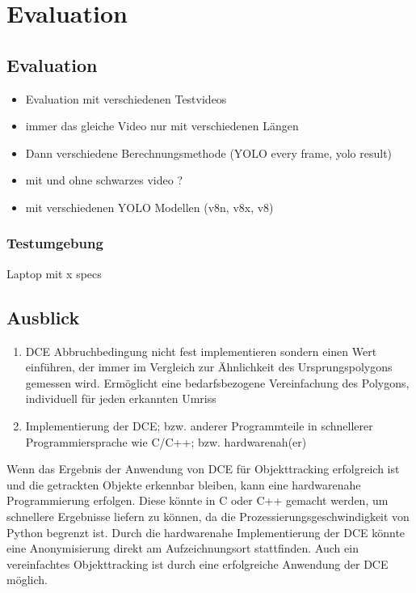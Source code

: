 \chapter{Evaluation}
\label{ch:Evaluation}

\section{Evaluation}
{
	\begin{itemize}
		\item Evaluation mit verschiedenen Testvideos
		\item immer das gleiche Video nur mit verschiedenen Längen
		\item Dann verschiedene Berechnungsmethode (YOLO every frame, yolo result)
		\item mit und ohne schwarzes video ?
		\item mit verschiedenen YOLO Modellen (v8n, v8x, v8)
	\end{itemize}

}
\subsection{Testumgebung}{
	Laptop mit x specs
}



\section{Ausblick}
\begin{enumerate}
	\item DCE Abbruchbedingung nicht fest implementieren sondern einen Wert einführen, der immer im Vergleich zur Ähnlichkeit des Ursprungspolygons gemessen wird. Ermöglicht eine bedarfsbezogene Vereinfachung des Polygons, individuell für jeden erkannten Umriss
	\item Implementierung der DCE; bzw. anderer Programmteile in schnellerer Programmiersprache wie C/C++; bzw. hardwarenah(er)
\end{enumerate}
{
	Wenn das Ergebnis der Anwendung von DCE für Objekttracking erfolgreich ist und die getrackten Objekte erkennbar bleiben, kann eine hardwarenahe Programmierung erfolgen. Diese könnte in C oder C++ gemacht werden, um schnellere Ergebnisse liefern zu können, da die Prozessierungsgeschwindigkeit von Python begrenzt ist.\newline
Durch die hardwarenahe Implementierung der DCE könnte eine Anonymisierung direkt am Aufzeichnungsort stattfinden. Auch ein vereinfachtes Objekttracking ist durch eine erfolgreiche Anwendung der DCE möglich.


}



